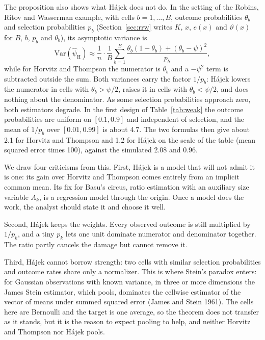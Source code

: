 The proposition also shows what H\'ajek does not do. In the setting of the Robins, Ritov and Wasserman example, with cells $b = 1, \ldots, B$, outcome probabilities $\theta_b$ and selection probabilities $p_b$ (Section~\ref{sec:rrw} writes $K$, $x$, $e(x)$ and $\vartheta(x)$ for $B$, $b$, $p_b$ and $\theta_b$), its asymptotic variance is
\[
\mathrm{Var}(\hat\psi_{\mathrm{H}}) \approx \frac{1}{n}\cdot\frac{1}{B}\sum_{b=1}^B \frac{\theta_b(1 - \theta_b) + (\theta_b - \psi)^2}{p_b},
\]
while for Horvitz and Thompson the numerator is $\theta_b$ and a $-\psi^2$ term is subtracted outside the sum. Both variances carry the factor $1/p_b$: H\'ajek lowers the numerator in cells with $\theta_b > \psi/2$, raises it in cells with $\theta_b < \psi/2$, and does nothing about the denominator. As some selection probabilities approach zero, both estimators degrade. In the first design of Table~\ref{tab:weak} the outcome probabilities are uniform on $[0.1, 0.9]$ and independent of selection, and the mean of $1/p_b$ over $[0.01, 0.99]$ is about 4.7. The two formulas then give about 2.1 for Horvitz and Thompson and 1.2 for H\'ajek on the scale of the table (mean squared error times 100), against the simulated 2.08 and 0.96.

We draw four criticisms from this. First, H\'ajek is a model that will not admit it is one: its gain over Horvitz and Thompson comes entirely from an implicit common mean. Its fix for Basu's circus, ratio estimation with an auxiliary size variable $A_k$, is a regression model through the origin. Once a model does the work, the analyst should state it and choose it well.

Second, H\'ajek keeps the weights. Every observed outcome is still multiplied by $1/p_k$, and a tiny $p_k$ lets one unit dominate numerator and denominator together. The ratio partly cancels the damage but cannot remove it.

Third, H\'ajek cannot borrow strength: two cells with similar selection probabilities and outcome rates share only a normalizer. This is where Stein's paradox enters: for Gaussian observations with known variance, in three or more dimensions the James Stein estimator, which pools, dominates the cellwise estimator of the vector of means under summed squared error (James and Stein 1961). The cells here are Bernoulli and the target is one average, so the theorem does not transfer as it stands, but it is the reason to expect pooling to help, and neither Horvitz and Thompson nor H\'ajek pools.

